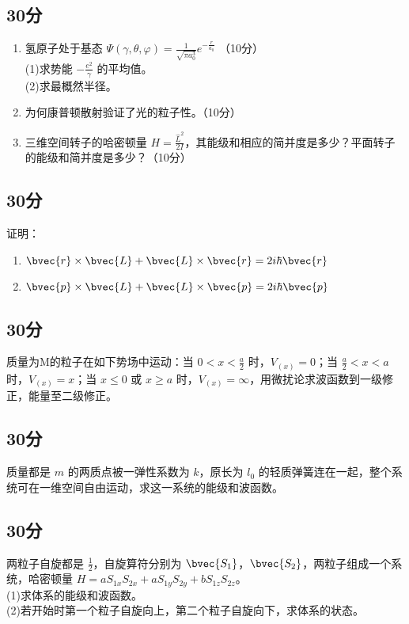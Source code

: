 
\subsection{30分}
\begin{enumerate}
\item 氢原子处于基态 $\varPsi(\gamma,\theta,\varphi)=\frac{1}{\sqrt{\pi a^{3}_{0}}}e^{-\frac{r}{a_0}}$ （10分）\\
(1)求势能 $-\frac{e^2}{\gamma}$ 的平均值。\\
(2)求最概然半径。\\
\item 为何康普顿散射验证了光的粒子性。（10分）\\
\item 三维空间转子的哈密顿量 $H=\frac{\hat{L}^2}{2I}$，其能级和相应的简并度是多少？平面转子的能级和简并度是多少？（10分）\\
\end{enumerate}
\subsection{30分}
证明：\\
\begin{enumerate}
\item $\bvec{r}\times \bvec{L}+ \bvec{L}\times \bvec{r} = 2i\hbar \bvec{r}$
\item $\bvec{p}\times\bvec{L}+\bvec{L}\times\bvec{p} = 2i\hbar \bvec{p}$
\end{enumerate}
\subsection{30分}
质量为M的粒子在如下势场中运动：当 $0<x<\frac{a}{2}$ 时，$V_{(x)}=0$；当 $\frac{a}{2} <x<a$ 时，$V_{(x)}=x$；当 $x \le 0$ 或 $x \ge a$ 时，$V_{(x)}=\infty$，用微扰论求波函数到一级修正，能量至二级修正。
\subsection{30分}
质量都是 $m$ 的两质点被一弹性系数为 $k$，原长为 $l_{0}$ 的轻质弹簧连在一起，整个系统可在一维空间自由运动，求这一系统的能级和波函数。
\subsection{30分}
两粒子自旋都是 $\frac{1}{2}$，自旋算符分别为 $\bvec{S_{1}}$，$\bvec{S_{2}}$，两粒子组成一个系统，哈密顿量 $H=aS_{1x}S_{2x}+aS_{1y}S_{2y}+bS_{1z}S_{2z}$。\\
(1)求体系的能级和波函数。\\
(2)若开始时第一个粒子自旋向上，第二个粒子自旋向下，求体系的状态。\\
